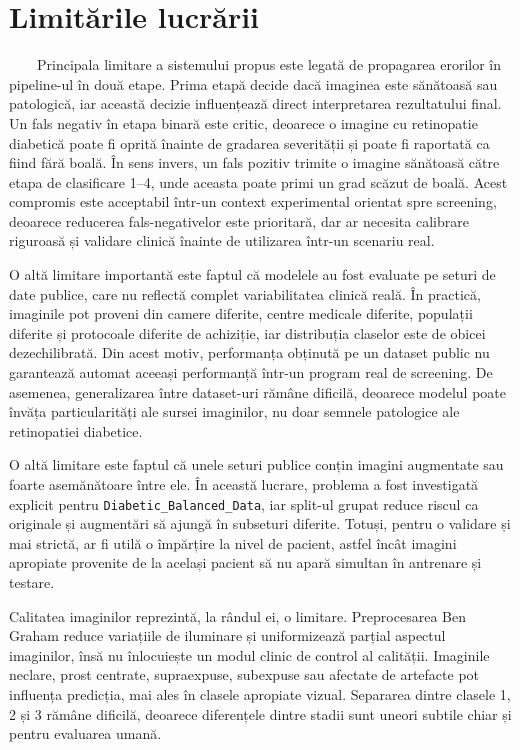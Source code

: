\documentclass[12pt, a4paper, twoside, romanian]{teza-upb}
\begin{document}
\section{Limitările lucrării}

\ \ \ \ Principala limitare a sistemului propus este legată de propagarea erorilor în pipeline-ul în
două etape. Prima etapă decide dacă imaginea este sănătoasă sau patologică, iar această decizie
influențează direct interpretarea rezultatului final. Un fals negativ în etapa binară este critic,
deoarece o imagine cu retinopatie diabetică poate fi oprită înainte de gradarea severității și poate fi
raportată ca fiind fără boală. În sens invers, un fals pozitiv trimite o imagine sănătoasă către etapa
de clasificare 1--4, unde aceasta poate primi un grad scăzut de boală. Acest compromis este acceptabil
într-un context experimental orientat spre screening, deoarece reducerea fals-negativelor este prioritară,
dar ar necesita calibrare riguroasă și validare clinică înainte de utilizarea într-un scenariu real.
\bigskip 

O altă limitare importantă este faptul că modelele au fost evaluate pe seturi de date publice, care nu
reflectă complet variabilitatea clinică reală. În practică, imaginile pot proveni din camere diferite,
centre medicale diferite, populații diferite și protocoale diferite de achiziție, iar distribuția
claselor este de obicei dezechilibrată. Din acest motiv, performanța obținută pe un dataset public nu
garantează automat aceeași performanță într-un program real de screening. De asemenea, generalizarea
între dataset-uri rămâne dificilă, deoarece modelul poate învăța particularități ale sursei imaginilor,
nu doar semnele patologice ale retinopatiei diabetice.
\bigskip

O altă limitare este faptul că unele seturi publice conțin imagini augmentate sau foarte
asemănătoare între ele. În această lucrare, problema a fost investigată explicit pentru
\newline \texttt{Diabetic\_Balanced\_Data}, iar split-ul grupat reduce riscul ca originale și augmentări
să ajungă în subseturi diferite. Totuși, pentru o validare și mai strictă, ar fi utilă o
împărțire la nivel de pacient, astfel încât imagini apropiate provenite de la același pacient
să nu apară simultan în antrenare și testare.
\bigskip

Calitatea imaginilor reprezintă, la rândul ei, o limitare. Preprocesarea Ben Graham reduce variațiile
de iluminare și uniformizează parțial aspectul imaginilor, însă nu înlocuiește un modul clinic de
control al calității. Imaginile neclare, prost centrate, supraexpuse, subexpuse sau afectate de
artefacte pot influența predicția, mai ales în clasele apropiate vizual. Separarea dintre clasele 1, 2
și 3 rămâne dificilă, deoarece diferențele dintre stadii sunt uneori subtile chiar și pentru evaluarea
umană.
\bigskip 
\end{document}
